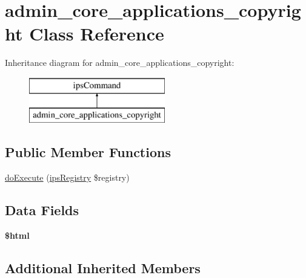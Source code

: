 \hypertarget{classadmin__core__applications__copyright}{\section{admin\-\_\-core\-\_\-applications\-\_\-copyright Class Reference}
\label{classadmin__core__applications__copyright}
}
Inheritance diagram for admin\-\_\-core\-\_\-applications\-\_\-copyright\-:\begin{figure}[H]
\begin{center}
\leavevmode
\includegraphics[height=2.000000cm]{classadmin__core__applications__copyright}
\end{center}
\end{figure}
\subsection*{Public Member Functions}
\begin{DoxyCompactItemize}
\item 
\hyperlink{classadmin__core__applications__copyright_afbc4e912a0604b94d47d66744c64d8ba}{do\-Execute} (\hyperlink{classips_registry}{ips\-Registry} \$registry)
\end{DoxyCompactItemize}
\subsection*{Data Fields}
\begin{DoxyCompactItemize}
\item 
\hypertarget{classadmin__core__applications__copyright_a6f96e7fc92441776c9d1cd3386663b40}{{\bfseries \$html}}\label{classadmin__core__applications__copyright_a6f96e7fc92441776c9d1cd3386663b40}

\end{DoxyCompactItemize}
\subsection*{Additional Inherited Members}


